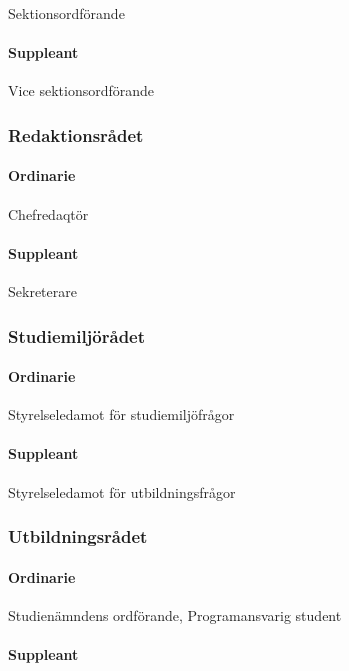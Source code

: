 \documentclass{dgovdoc}
\begin{document}
Sektionsordförande

\paragraph{Suppleant}

Vice sektionsordförande

\subsubsection{Redaktionsrådet}

\paragraph{Ordinarie}

Chefredaqtör

\paragraph{Suppleant}

Sekreterare

\subsubsection{Studiemiljörådet}

\paragraph{Ordinarie}

Styrelseledamot för studiemiljöfrågor

\paragraph{Suppleant}

Styrelseledamot för utbildningsfrågor

\subsubsection{Utbildningsrådet}

\paragraph{Ordinarie}

Studienämndens ordförande, Programansvarig student

\paragraph{Suppleant}
\end{document}
